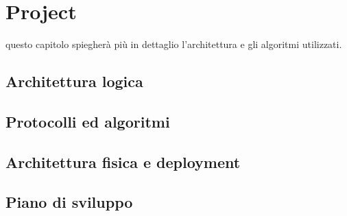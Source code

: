 \documentclass{memoir}
\begin{document}
\chapter{Project}

questo capitolo spiegherà più in dettaglio l'architettura e gli algoritmi utilizzati.

\section{Architettura logica}
\section{Protocolli ed algoritmi}
\section{Architettura fisica e deployment}
\section{Piano di sviluppo}


%
%
%
%
%
\end{document}
